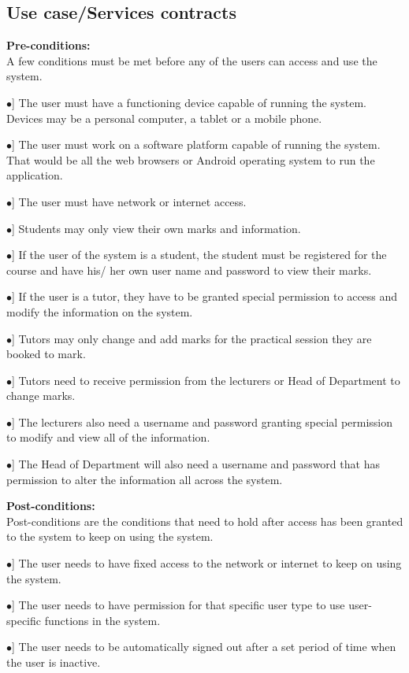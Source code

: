 \documentclass[12pt, a4paper]{scrartcl}
\newcommand{\tab}[1]{\hspace{.05\textwidth}\rlap{#1}}
\begin{document}
			\subsection{Use case/Services contracts}
				\textbf{Pre-conditions:}\\
				A few conditions must be met before any of the users can access and use the system.
				\begin{description}
					\item \tab [$\bullet$] The user must have a functioning device capable of running the system. Devices may be a personal computer, a tablet or a mobile phone.
					\item \tab [$\bullet$] The user must work on a software platform capable of running the system. That would be all the web browsers or Android operating system to run the application.
					\item \tab [$\bullet$] The user must have network or internet access.
					\item \tab [$\bullet$] Students may only view their own marks and information.
					\item \tab [$\bullet$] If the user of the system is a student, the student must be registered for the course and have his/ her own user name and password to view their marks.
					\item \tab [$\bullet$] If the user is a tutor, they have to be granted special permission to access and modify the information on the system.
					\item \tab [$\bullet$] Tutors may only change and add marks for the practical session they are booked to mark.
					\item \tab [$\bullet$] Tutors need to receive permission from the lecturers or Head of Department to change marks.
					\item \tab [$\bullet$] The lecturers also need a username and password granting special permission to modify and view all of the information.
					\item \tab [$\bullet$] The Head of Department will also need a username and password that has permission to alter the information all across the system.
				\end{description}
				\textbf{Post-conditions:}\\
				Post-conditions are the conditions that need to hold after access has been granted to the system to keep on using the system.
				\begin{description}
					\item \tab [$\bullet$] The user needs to have fixed access to the network or internet to keep on using the system.
					\item \tab [$\bullet$] The user needs to have permission for that specific user type to use user-specific functions in the system.
					\item \tab [$\bullet$] The user needs to be automatically signed out after a set period of time when the user is inactive. 
				\end{description}
\end{document}
